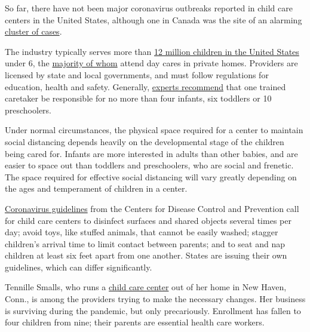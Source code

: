 So far, there have not been major coronavirus outbreaks reported in
child care centers in the United States, although one in Canada was the
site of an alarming
\href{https://montreal.ctvnews.ca/16-infected-north-of-montreal-in-quebec-s-first-covid-19-outbreak-in-a-daycare-1.4927853}{cluster
of cases}.

The industry typically serves more than
\href{https://cdn2.hubspot.net/hubfs/3957809/State\%20Fact\%20Sheets\%202019/2019StateFactSheets-Overview.pdf}{12
million children in the United States} under 6, the
\href{https://www.childtrends.org/most-child-care-providers-in-the-united-states-are-based-in-homes-not-centers}{majority
of whom} attend day cares in private homes. Providers are licensed by
state and local governments, and must follow regulations for education,
health and safety. Generally,
\href{https://www.childcare.gov/index.php/consumer-education/ratios-and-group-sizes}{experts
recommend} that one trained caretaker be responsible for no more than
four infants, six toddlers or 10 preschoolers.

Under normal circumstances, the physical space required for a center to
maintain social distancing depends heavily on the developmental stage of
the children being cared for. Infants are more interested in adults than
other babies, and are easier to space out than toddlers and
preschoolers, who are social and frenetic. The space required for
effective social distancing will vary greatly depending on the ages and
temperament of children in a center.

\href{https://www.cdc.gov/coronavirus/2019-ncov/downloads/php/CDC-Activities-Initiatives-for-COVID-19-Response.pdf}{Coronavirus
guidelines} from the Centers for Disease Control and Prevention call for
child care centers to disinfect surfaces and shared objects several
times per day; avoid toys, like stuffed animals, that cannot be easily
washed; stagger children's arrival time to limit contact between
parents; and to seat and nap children at least six feet apart from one
another. States are issuing their own guidelines, which can differ
significantly.

Tennille Smalls, who runs a
\href{https://www.instagram.com/gentlehandsacademydaycare/}{child care
center} out of her home in New Haven, Conn., is among the providers
trying to make the necessary changes. Her business is surviving during
the pandemic, but only precariously. Enrollment has fallen to four
children from nine; their parents are essential health care workers.

